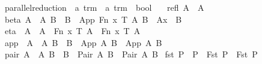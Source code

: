 \begin{implementation}
\isamarkupfalse%
\ parallel{\isacharunderscore}reduction\ {\isacharcolon}{\isacharcolon}\ {\isachardoublequoteopen}{\isacharprime}a\ trm\ {\isasymRightarrow}\ {\isacharprime}a\ trm\ {\isasymRightarrow}\ bool{\isachardoublequoteclose}\ \isanewline
\ \ refl{\isacharcolon}\ {\isachardoublequoteopen}A\ {\isachargreater}{\isachargreater}\ A{\isachardoublequoteclose}\isanewline
{\isacharbar}\ beta{\isacharcolon}\ {\isachardoublequoteopen}{\isasymlbrakk}A\ {\isachargreater}{\isachargreater}\ A{\isacharprime}{\isacharsemicolon}\ B\ {\isachargreater}{\isachargreater}\ B{\isacharprime}{\isasymrbrakk}\ {\isasymLongrightarrow}\ {\isacharparenleft}App\ {\isacharparenleft}Fn\ x\ T\ A{\isacharparenright}\ B{\isacharparenright}\ {\isachargreater}{\isachargreater}\ {\isacharparenleft}A{\isacharprime}{\isacharbrackleft}x\ {\isacharcolon}{\isacharcolon}{\isacharequal}\ B{\isacharprime}{\isacharbrackright}{\isacharparenright}{\isachardoublequoteclose}\isanewline
{\isacharbar}\ eta{\isacharcolon}\ \ {\isachardoublequoteopen}A\ {\isachargreater}{\isachargreater}\ A{\isacharprime}\ {\isasymLongrightarrow}\ {\isacharparenleft}Fn\ x\ T\ A{\isacharparenright}\ {\isachargreater}{\isachargreater}\ {\isacharparenleft}Fn\ x\ T\ A{\isacharprime}{\isacharparenright}{\isachardoublequoteclose}\isanewline
{\isacharbar}\ app{\isacharcolon}\ \ {\isachardoublequoteopen}{\isasymlbrakk}A\ {\isachargreater}{\isachargreater}\ A{\isacharprime}{\isacharsemicolon}\ B\ {\isachargreater}{\isachargreater}\ B{\isacharprime}{\isasymrbrakk}\ {\isasymLongrightarrow}\ {\isacharparenleft}App\ A\ B{\isacharparenright}\ {\isachargreater}{\isachargreater}\ {\isacharparenleft}App\ A{\isacharprime}\ B{\isacharprime}{\isacharparenright}{\isachardoublequoteclose}\isanewline
{\isacharbar}\ pair{\isacharcolon}\ {\isachardoublequoteopen}{\isasymlbrakk}A\ {\isachargreater}{\isachargreater}\ A{\isacharprime}{\isacharsemicolon}\ B\ {\isachargreater}{\isachargreater}\ B{\isacharprime}{\isasymrbrakk}\ {\isasymLongrightarrow}\ {\isacharparenleft}Pair\ A\ B{\isacharparenright}\ {\isachargreater}{\isachargreater}\ {\isacharparenleft}Pair\ A{\isacharprime}\ B{\isacharprime}{\isacharparenright}{\isachardoublequoteclose}\isanewline
{\isacharbar}\ fst{}{\isacharcolon}\ {\isachardoublequoteopen}P\ {\isachargreater}{\isachargreater}\ P{\isacharprime}\ {\isasymLongrightarrow}\ {\isacharparenleft}Fst\ P{\isacharparenright}\ {\isachargreater}{\isachargreater}\ {\isacharparenleft}Fst\ P{\isacharprime}{\isacharparenright}{\isachardoublequoteclose}\isanewline

\end{implementation}
